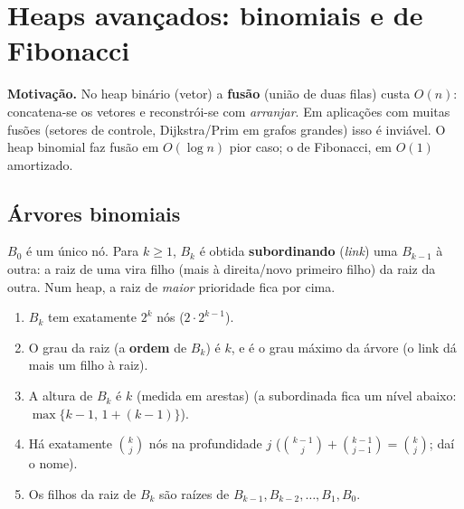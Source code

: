 \section{Heaps avançados: binomiais e de Fibonacci}\label{sec:heapav}
\textbf{Motivação.} No heap binário (vetor) a \textbf{fusão} (união de duas filas) custa $O(n)$: concatena-se os vetores e reconstrói-se com \emph{arranjar}. Em aplicações com muitas fusões (setores de controle, Dijkstra/Prim em grafos grandes) isso é inviável. O heap binomial faz fusão em $O(\log n)$ pior caso; o de Fibonacci, em $O(1)$ amortizado.

\subsection{Árvores binomiais}\label{sec:binomial}
\begin{defi}
$B_0$ é um único nó. Para $k\ge1$, $B_k$ é obtida \textbf{subordinando} (\emph{link}) uma $B_{k-1}$ à outra: a raiz de uma vira filho (mais à direita/novo primeiro filho) da raiz da outra. Num heap, a raiz de \emph{maior} prioridade fica por cima.
\end{defi}

\begin{center}
\end{center}

\begin{prop}\label{prop:binom}\leavevmode
\begin{enumerate}
  \item $B_k$ tem exatamente $2^k$ nós \quad($2\cdot2^{k-1}$).
  \item O grau da raiz (a \textbf{ordem} de $B_k$) é $k$, e é o grau máximo da árvore \quad(o link dá mais um filho à raiz).
  \item A altura de $B_k$ é $k$ (medida em arestas) \quad(a subordinada fica um nível abaixo: $\max\{k-1,\,1+(k-1)\}$).
  \item Há exatamente $\binom kj$ nós na profundidade $j$ \quad($\binom{k-1}{j}+\binom{k-1}{j-1}=\binom kj$; daí o nome).
  \item Os filhos da raiz de $B_k$ são raízes de $B_{k-1},B_{k-2},\dots,B_1,B_0$.
\end{enumerate}
\end{prop}

